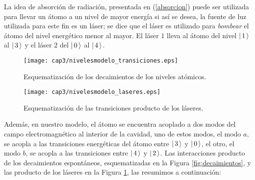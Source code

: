 \quad La idea de absorci\'on de radiaci\'on, presentada en (\ref{absorcion}) puede ser utilizada para llevar un \'atomo a un nivel de mayor energ\'ia si as\'i se desea, la fuente de luz utilizada para este fin es un l\'aser; se dice que el l\'aser es utilizado para \emph{bombear} el \'atomo del nivel energ\'etico menor al mayor. El l\'aser $1$ lleva al \'atomo del nivel $\vert\, 1 \,\rangle$ al $\vert\, 3 \,\rangle$ y el l\'aser $2$ del $\vert\, 0 \,\rangle$ al $\vert\, 4 \,\rangle$.\\
\begin{figure}[h]
\centering
\begin{minipage}{0.52 \linewidth}
\centering
  \texttt{[image: cap3/nivelesmodelo\_transiciones.eps]}\caption{Esquematizaci\'on de los decaimientos de los niveles at\'omicos.}\label{fig:decaimientos}
\end{minipage}
\begin{minipage}{0.52 \linewidth}
\centering
  \texttt{[image: cap3/nivelesmodelo\_laseres.eps]}\caption{Esquematizaci\'on de las transiciones producto de los l\'aseres.}\label{fig:laseres}
\end{minipage}
\end{figure}
\clearpage

\quad Adem\'as, en nuestro modelo, el \'atomo se encuentra acoplado a dos modos del campo electromagn\'etico al interior de la cavidad, uno de estos modos, el modo $a$, se acopla a las transiciones energ\'eticas del \'atomo entre $\vert\, 3 \,\rangle$ y $\vert\, 0 \,\rangle$, el otro, el modo $b$, se acopla a las transiciones entre $\vert\, 4 \,\rangle$ y $\vert\, 2 \,\rangle$. Las interacciones producto de los decaimientos espont\'aneos, esquematizadas en la Figura \ref{fig:decaimientos}, y las producto de los l\'aseres en la Figura \ref{fig:laseres}, las resumimos a continuaci\'on:

